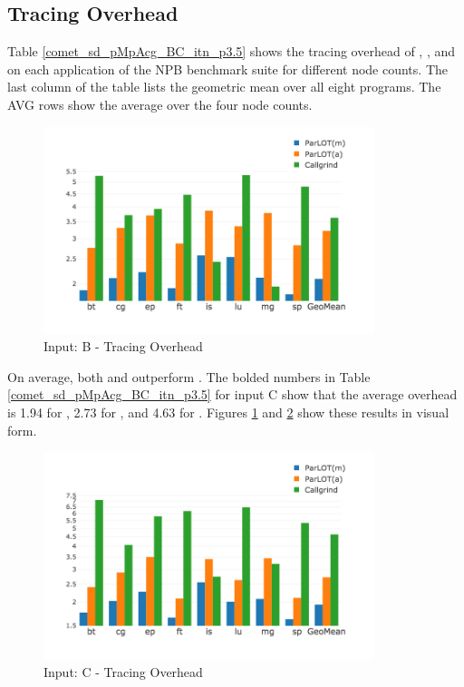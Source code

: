 

\subsection{Tracing Overhead}
\label{subsec:lowtoh}



Table \ref{comet_sd_pMpAcg_BC_itn_p3.5} shows the tracing overhead of \parlotm, \parlota, and \callgrind on each application of the NPB benchmark suite for different node counts. The last column of the table lists the geometric mean over all eight programs. The AVG rows show the average over the four node counts.

\begin{figure}[t]
\centering
\includegraphics[width=3.8in]{figs.comet.newMed/comet_chartAvg_sd_B_p3_5.png}
\caption{ Input: B - Tracing Overhead
}
\label{comet_chartAvg_sd_B_p3_5}
\end{figure}


On average, both \parlotm and \parlota outperform \callgrind. The bolded numbers in Table \ref{comet_sd_pMpAcg_BC_itn_p3.5} for input C show that the average overhead is 1.94 for \parlotm, 2.73 for \parlota, and 4.63 for \callgrind. Figures \ref{comet_chartAvg_sd_B_p3_5} and \ref{comet_chartAvg_sd_C_p3_5} show these results in visual form.

\begin{figure}[t]
\centering
\includegraphics[width=3.8in]{figs.comet.newMed/comet_chartAvg_sd_C_p3_5.png}
\caption{ Input: C - Tracing Overhead}
\label{comet_chartAvg_sd_C_p3_5}
\end{figure}


